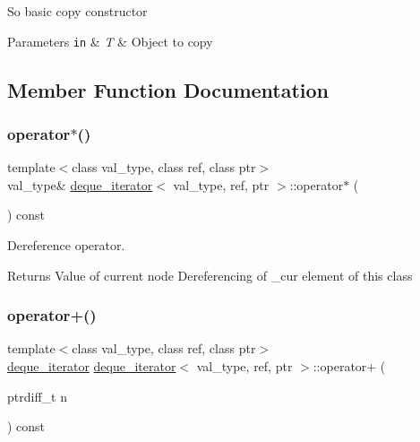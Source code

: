 So basic copy constructor 
\begin{DoxyParams}[1]{Parameters}
\mbox{\tt in}  & {\em T} & Object to copy \\
\hline
\end{DoxyParams}


\subsection{Member Function Documentation}
\hypertarget{structdeque__iterator_aa5b4c3e1340a732ea04721f69170572d}{}\label{structdeque__iterator_aa5b4c3e1340a732ea04721f69170572d} 
\subsubsection{\texorpdfstring{operator$\ast$()}{operator*()}}
{\footnotesize\ttfamily template$<$class val\+\_\+type, class ref, class ptr$>$ \\
val\+\_\+type\& \hyperlink{structdeque__iterator}{deque\+\_\+iterator}$<$ val\+\_\+type, ref, ptr $>$\+::operator$\ast$ (\begin{DoxyParamCaption}{ }\end{DoxyParamCaption}) const\hspace{0.3cm}{\ttfamily [inline]}}



Dereference operator. 

\begin{DoxyReturn}{Returns}
Value of current node Dereferencing of \+\_\+cur element of this class 
\end{DoxyReturn}
\hypertarget{structdeque__iterator_afe780014ad74f573b3eb154e91d0f66c}{}\label{structdeque__iterator_afe780014ad74f573b3eb154e91d0f66c} 
\subsubsection{\texorpdfstring{operator+()}{operator+()}}
{\footnotesize\ttfamily template$<$class val\+\_\+type, class ref, class ptr$>$ \\
\hyperlink{structdeque__iterator}{deque\+\_\+iterator} \hyperlink{structdeque__iterator}{deque\+\_\+iterator}$<$ val\+\_\+type, ref, ptr $>$\+::operator+ (\begin{DoxyParamCaption}\item[{ptrdiff\+\_\+t}]{n }\end{DoxyParamCaption}) const\hspace{0.3cm}{\ttfamily [inline]}}



